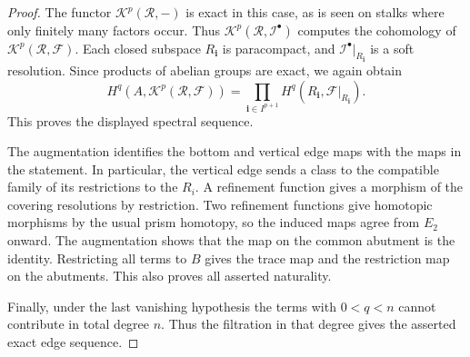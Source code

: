 \begin{proof}
The functor $\mathcal K^p(\mathcal R,-)$ is exact in this case, as is seen
on stalks where only finitely many factors occur. Thus
$\mathcal K^p(\mathcal R,\mathcal I^\bullet)$ computes the cohomology of
$\mathcal K^p(\mathcal R,\mathcal F)$. Each closed subspace
$R_{\mathbf i}$ is paracompact, and
$\mathcal I^\bullet|_{R_{\mathbf i}}$ is a soft resolution. Since products
of abelian groups are exact, we again obtain
$$
H^q(A,\mathcal K^p(\mathcal R,\mathcal F))=
\prod_{\mathbf i\in I^{p+1}}
H^q(R_{\mathbf i},\mathcal F|_{R_{\mathbf i}}).
$$
This proves the displayed spectral sequence.

The augmentation identifies the bottom and vertical edge maps with the
maps in the statement. In particular, the vertical edge sends a class to
the compatible family of its restrictions to the $R_i$. A refinement
function gives a morphism of the covering resolutions by restriction.
Two refinement functions give homotopic morphisms by the usual prism
homotopy, so the induced maps agree from $E_2$ onward. The augmentation
shows that the map on the common abutment is the identity. Restricting all
terms to $B$ gives the trace map and the restriction map on the abutments.
This also proves all asserted naturality.

Finally, under the last vanishing hypothesis the terms with
$0<q<n$ cannot contribute in total degree $n$. Thus the filtration in that
degree gives the asserted exact edge sequence.
\end{proof}


